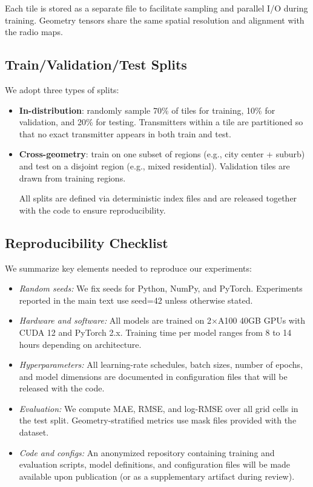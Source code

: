 \documentclass{article}
\begin{document}
Each tile is stored as a separate file to facilitate sampling and
parallel I/O during training.
Geometry tensors share the same spatial resolution and alignment
with the radio maps.

\subsection{Train/Validation/Test Splits}

We adopt three types of splits:

\begin{itemize}[leftmargin=1.5em]
\item \textbf{In-distribution}:
randomly sample 70\% of tiles for training,
10\% for validation, and 20\% for testing.
Transmitters within a tile are partitioned so that
no exact transmitter appears in both train and test.

\item \textbf{Cross-geometry}:
train on one subset of regions
(e.g., city center + suburb) and test on a disjoint region
(e.g., mixed residential).
Validation tiles are drawn from training regions.

All splits are defined via deterministic index files and are
released together with the code to ensure reproducibility.
\end{itemize}

\subsection{Reproducibility Checklist}

We summarize key elements needed to reproduce our experiments:

\begin{itemize}[leftmargin=1.5em]
\item \emph{Random seeds:}
We fix seeds for Python, NumPy, and PyTorch.
Experiments reported in the main text use seed=42
unless otherwise stated.

\item \emph{Hardware and software:}
All models are trained on 2$\times$A100 40GB GPUs
with CUDA 12 and PyTorch 2.x.
Training time per model ranges from 8 to 14 hours
depending on architecture.

\item \emph{Hyperparameters:}
All learning-rate schedules, batch sizes, number of epochs,
and model dimensions are documented in configuration files
that will be released with the code.

\item \emph{Evaluation:}
We compute MAE, RMSE, and log-RMSE over all grid cells in the test split.
Geometry-stratified metrics use mask files provided with the dataset.

\item \emph{Code and configs:}
An anonymized repository containing training and evaluation scripts,
model definitions, and configuration files will be made available
upon publication (or as a supplementary artifact during review).
\end{itemize}
\end{document}
